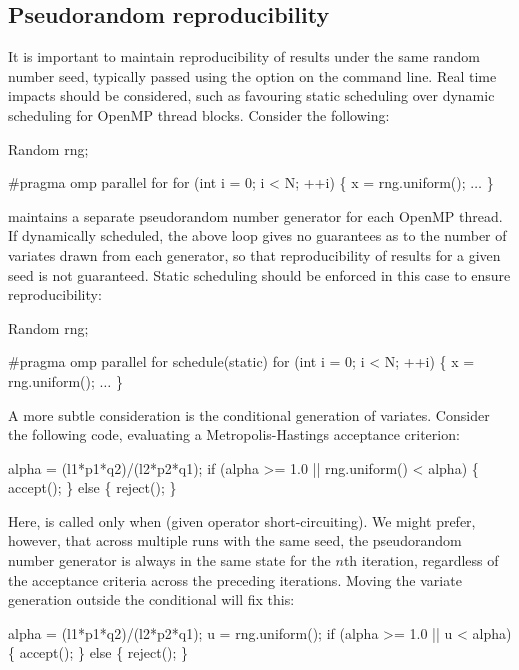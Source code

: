 \subsection{Pseudorandom reproducibility\label{Pseudorandom_reproducibility}}

It is important to maintain reproducibility of results under the same random
number seed, typically passed using the
 option on the command line. Real time impacts should be
considered, such as favouring static scheduling over
dynamic scheduling for OpenMP thread
blocks. Consider the following:
\begin{cppcode}
Random rng;

#pragma omp parallel for
for (int i = 0; i < N; ++i) \{
  x = rng.uniform();
  \(\ldots\)
\}
\end{cppcode}

 maintains a separate pseudorandom number
generator for each OpenMP thread. If
dynamically scheduled, the above loop gives no guarantees as to the number of
variates drawn from each generator, so that reproducibility of results for a
given seed is not guaranteed. Static scheduling should be enforced in this
case to ensure reproducibility:
\begin{cppcode}
Random rng;

#pragma omp parallel for schedule(static)
for (int i = 0; i < N; ++i) \{
  x = rng.uniform();
  \(\ldots\)
\}
\end{cppcode}

A more subtle consideration is the conditional generation of
variates. Consider the following code, evaluating a
Metropolis-Hastings acceptance criterion:
\begin{cppcode}
alpha = (l1*p1*q2)/(l2*p2*q1);
if (alpha >= 1.0 || rng.uniform() < alpha) \{
  accept();
\} else \{
  reject();
\}
\end{cppcode}
Here,  is called only when  (given
operator short-circuiting). We might prefer, however, that across multiple
runs with the same seed, the pseudorandom number generator is always in the
same state for the $n$th iteration, regardless of the acceptance criteria
across the preceding iterations. Moving the variate generation outside the
conditional will fix this:
\begin{cppcode}
alpha = (l1*p1*q2)/(l2*p2*q1);
u = rng.uniform();
if (alpha >= 1.0 || u < alpha) \{
  accept();
\} else \{
  reject();
\}
\end{cppcode}


